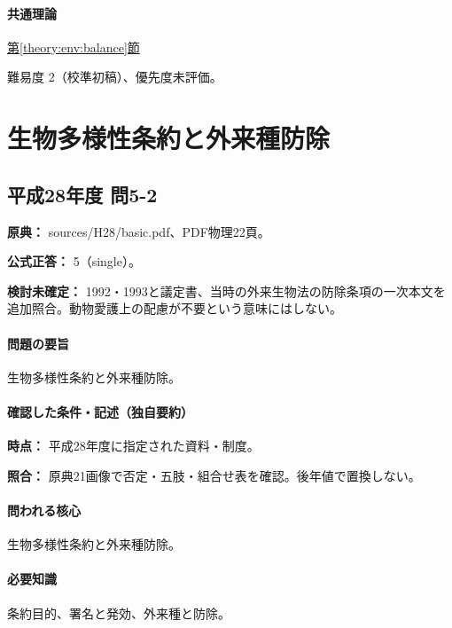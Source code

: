 \paragraph{共通理論} \hyperref[theory:env:balance]{第\ref*{theory:env:balance}節}

\par 難易度 2（校準初稿）、優先度未評価。

\section{生物多様性条約と外来種防除}

\subsection{平成28年度 問5-2}
\label{q:h28-reg-basic-5-2}

\noindent\textbf{原典：} sources/H28/basic.pdf、PDF物理22頁。

\textbf{公式正答：} 5（single）。

\par\textbf{検討未確定：} 1992・1993と議定書、当時の外来生物法の防除条項の一次本文を追加照合。動物愛護上の配慮が不要という意味にはしない。

\paragraph{問題の要旨} 生物多様性条約と外来種防除。

\paragraph{確認した条件・記述（独自要約）}\mbox{}\par

\noindent\textbf{時点：} 平成28年度に指定された資料・制度。\par

\noindent\textbf{照合：} 原典21画像で否定・五肢・組合せ表を確認。後年値で置換しない。\par

\paragraph{問われる核心} 生物多様性条約と外来種防除。

\paragraph{必要知識} 条約目的、署名と発効、外来種と防除。


